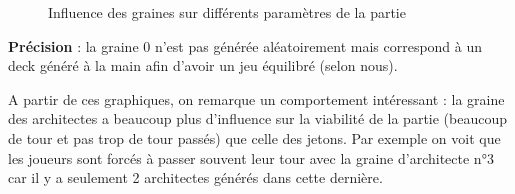 \begin{figure}[H]
\begin{subfigure}[b]{0.3\textwidth}
    \end{subfigure} 
    \caption{Influence des graines sur différents paramètres de la partie}
\end{figure}
\begin{summary}
\textbf{Précision} : la graine 0 n'est pas générée aléatoirement mais correspond à un deck généré à la main afin d'avoir un jeu équilibré (selon nous).
\end{summary}
A partir de ces graphiques, on remarque un comportement intéressant : la graine des architectes a beaucoup plus d'influence sur la viabilité de la partie (beaucoup de tour et pas trop de tour passés) que celle des jetons. Par exemple on voit que les joueurs sont forcés à passer souvent leur tour avec la graine d'architecte n°3 car il y a seulement 2 architectes générés dans cette dernière.